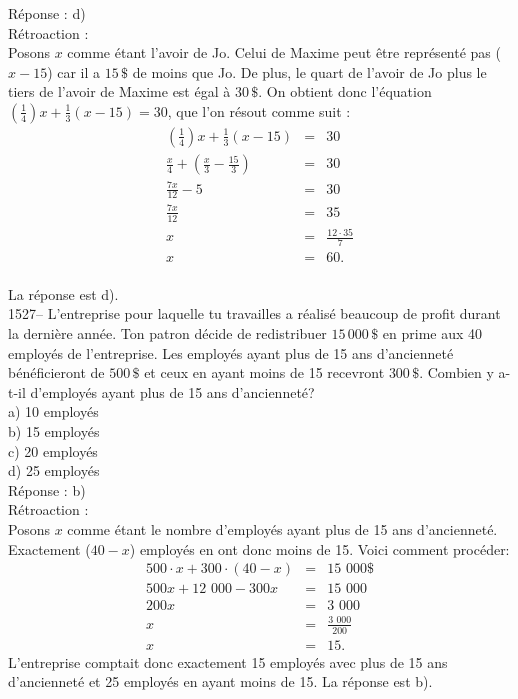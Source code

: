 R\'eponse : d)\\

R\'etroaction :\\
Posons $x$ comme \'etant l'avoir de Jo. Celui de Maxime peut \^etre
repr\'esent\'e pas ($x-15$) car il a $15\,\$$ de moins que Jo. De
plus, le quart de l'avoir de Jo plus le tiers de l'avoir de Maxime
est \'egal \`a $30\,\$$. On obtient donc l'\'equation
$(\frac{1}{4})x +\frac{1}{3}(x-15)=30$, que l'on r\'esout comme suit
:
\begin{eqnarray*}
\left(\frac{1}{4}\right)x +\frac{1}{3}(x-15)&=&30  \\[3mm] \frac{x}{4}+
(\frac{x}{3}-\frac{15}{3})&=&30 \\[3mm]
\frac{7x}{12}-5&=&30
\\[3mm]
\frac{7x}{12}&=&35 \\[3mm] x&=&\frac{12\cdot 35}{7}\\[3mm] x&=&60.
\end{eqnarray*}\\
La r\'eponse est d).\\

1527-- L'entreprise pour laquelle tu travailles a r\'ealis\'e
beaucoup de profit durant la derni\`ere ann\'ee. Ton patron d\'ecide
de redistribuer $15\,000\,\$$ en prime aux 40 employ\'es de
l'entreprise. Les employ\'es ayant plus de 15 ans d'anciennet\'e
b\'en\'eficieront de $500\,\$$ et ceux en ayant moins de 15
recevront $300\,\$$.
Combien y a-t-il d'employ\'es ayant plus de 15 ans d'anciennet\'e?\\
a) 10 employ\'es\\
b) 15 employ\'es\\
c) 20 employ\'es\\
d) 25 employ\'es\\

R\'eponse : b)\\

R\'etroaction :\\
Posons $x$  comme \'etant le nombre d'employ\'es ayant plus de 15
ans d'anciennet\'e. Exactement ($40-x$) employ\'es en ont donc moins
de 15. Voici comment proc\'eder:
\begin{eqnarray*}
{\textrm{500}}\cdot x+{\textrm{300}}\cdot (40-x)&=&{\textrm{15 000}}\$ \\
500x+{\textrm{12 000}}-300x&=&{\textrm{15 000}}\\
200x&=&{\textrm{3 000}} \\[3mm] x&=&\frac{\textrm{3 000}}{200} \\[3mm]
x&=&15.
\end{eqnarray*}
L'entreprise comptait donc exactement 15 employ\'es avec plus de 15 ans
d'anciennet\'e et 25 employ\'es en ayant moins de 15. La r\'eponse est b).\\

